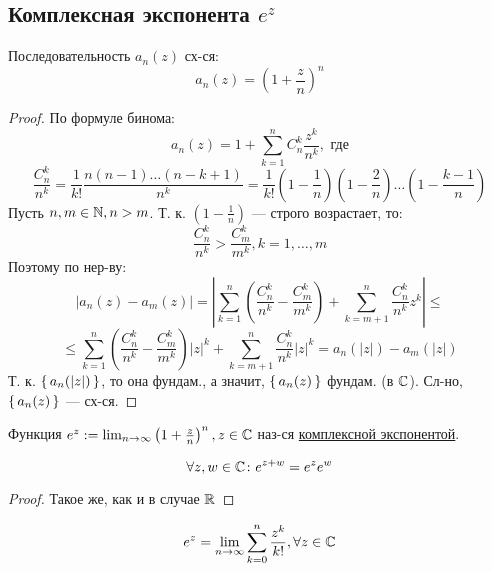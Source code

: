 \subsection{Комплексная экспонента $e^{z}$}
\begin{statement}
  Последовательность $a_n(z)$ сх-ся:
\[
a_n(z) = \left(1 + \frac{z}{n}\right)^{n} 
\]
\end{statement}
\begin{proof}
По формуле бинома:
\[
a_n(z) = 1 + \sum_{k = 1}^{n} C_{n}^{k} \frac{z^{k}}{n^{k}}, \text{ где}
\]
\[
  \frac{C_{n}^{k}}{n^{k}} = \frac{1}{k!}\frac{n(n - 1) \ldots (n - k + 1)}{n^{k}} = \frac{1}{k!}\left(1 - \frac{1}{n}\right)\left(1 - \frac{2}{n}\right)\ldots\left(1 - \frac{k - 1}{n}\right)
\]
Пусть $n, m \in \mathbb{N}, n > m$. Т. к. $\left(1 - \frac{1}{n}\right)$ --- строго возрастает, то:
\[
  \frac{C_{n}^{k}}{n^{k}} > \frac{C_{m}^{k}}{m^{k}}, k = 1, \ldots, m
\]
Поэтому по нер-ву:
\[
\left|a_n(z) - a_m(z)\right| = \left|\sum_{k = 1}^{n} \left(\frac{C_{n}^{k}}{n^{k}} - \frac{C_{m}^{k}}{m^{k}}\right) + \sum_{k = m + 1}^{n} \frac{C_{n}^{k}}{n^{k}}z^{k}\right| \leq
\]
\[
\leq \sum_{k = 1}^{n}\left(\frac{C_{n}^{k}}{n^{k}} - \frac{C_{m}^{k}}{m^{k}}\right)\left|z\right|^{k} + \sum_{k = m + 1}^{n} \frac{C_{n}^{k}}{n^{k}} \left|z\right|^{k} = a_n(\left|z\right|) - a_m(\left|z\right|) 
\]
Т. к. $\set{a_n(\left|z\right|)}$, то она фундам., а значит, $\set{a_n(z)}$ фундам. (в $\mathbb{C}$). Сл-но, $\set{a_n(z)}$ --- сх-ся.
\end{proof}
\begin{definition}
Функция $e^{z} := \lim_{n\to\infty} \left(1 + \frac{z}{n}\right)^{n}, z \in \mathbb{C}$ наз-ся \underline{комплексной экспонентой}.
\end{definition}
\begin{statement}
\[
\forall z, w \in \mathbb{C} \colon e^{z + w} = e^{z}e^{w}
\]
\end{statement}
\begin{proof}
Такое же, как и в случае $\mathbb{R}$
\end{proof}
\begin{theorem}
\label{th:exp_form}
\[
e^{z} = \lim_{n\to \infty} \sum_{k = 0}^{n} \frac{z^{k}}{k!}, \forall z \in \mathbb{C}
\]
\end{theorem}
